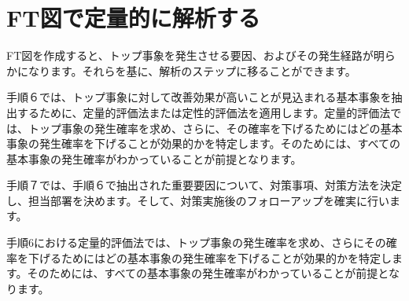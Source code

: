 \section{FT図で定量的に解析する}
FT図を作成すると、トップ事象を発生させる要因、およびその発生経路が明らかになります。それらを基に、解析のステップに移ることができます。

手順６では、トップ事象に対して改善効果が高いことが見込まれる基本事象を抽出するために、定量的評価法または定性的評価法を適用します。定量的評価法では、トップ事象の発生確率を求め、さらに、その確率を下げるためにはどの基本事象の発生確率を下げることが効果的かを特定します。そのためには、すべての基本事象の発生確率がわかっていることが前提となります。

手順７では、手順６で抽出された重要要因について、対策事項、対策方法を決定し、担当部署を決めます。そして、対策実施後のフォローアップを確実に行います。

手順6における定量的評価法では、トップ事象の発生確率を求め、さらにその確率を下げるためにはどの基本事象の発生確率を下げることが効果的かを特定します。そのためには、すべての基本事象の発生確率がわかっていることが前提となります。
\renewcommand{\labelenumi}{(\roman{enumi})}

